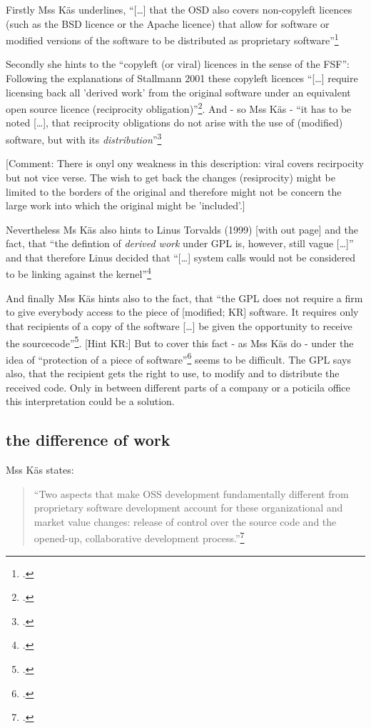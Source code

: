 \documentclass[DIV=calc,BCOR=5mm,11pt,headings=small,oneside,abstract=true, toc=bib]{scrartcl}
\begin{document}
Firstly Mss Käs underlines, \enquote{[\ldots] that the OSD also covers
non-copyleft licences (such as the BSD licence or the Apache licence) that
allow for software or modified versions of the software to be distributed as
proprietary software}\footcite[cf.][63]{Kaes2008a}

Secondly she hints to the \enquote{copyleft (or viral) licences in the sense of
the FSF}: Following the explanations of Stallmann 2001 these copyleft
licences \enquote{[\ldots] require licensing back all 'derived work' from the
original software under an equivalent open source licence (reciprocity
obligation)}\footcite[cf.][63]{Kaes2008a}. And - so Mss Käs -
\enquote{it has to be noted [\ldots], that reciprocity obligations do not
arise with the use of (modified) software, but with its
\textit{distribution}}\footcite[cf.][63 emph.i.o.]{Kaes2008a}

[Comment: There is onyl ony weakness in this description: viral covers
recirpocity but not vice verse. The wish to get back the changes (resiprocity)
might be limited to the borders of the original and therefore might not be
concern the large work into which the original might be 'included'.]

Nevertheless Ms Käs also hints to Linus Torvalds (1999) [with out page] and the
fact, that \enquote{the defintion of \textit{derived work} under GPL is, however,
still vague [\ldots]} and that therefore Linus decided
that \enquote{[\ldots] system calls would not be considered to be linking against
the kernel}\footcite[cf.][63 emph.i.o. last part of the quote
is a requote of Linus statement quoted bei Käs]{Kaes2008a}

And finally Mss Käs hints also to the fact, that \enquote{the GPL does not
require a firm to give everybody access to the piece of
[modified; KR] software. It requires only that recipients of a copy of
the software [\ldots] be given the opportunity to receive the
sourcecode}\footcite[cf.][77]{Kaes2008a}. [Hint KR:] But to cover this
fact - as Mss Käs do - under the idea of \enquote{protection of a piece of
software}\footcite[cf.][77]{Kaes2008a} seems to be difficult. The GPL says
also, that the recipient gets the right to use, to modify and to distribute the
received code. Only in between different parts of a company or a poticila office
this interpretation could be a solution.

\subsection{the difference of work}

Mss Käs states:

\begin{quote} \enquote{Two aspects that make OSS development fundamentally
different from proprietary software development account for these
organizational and market value changes: release of control over the
source code and the opened-up, collaborative development
process.}\footcite[][65]{Kaes2008a}
\end{quote}
\small

\end{document}
